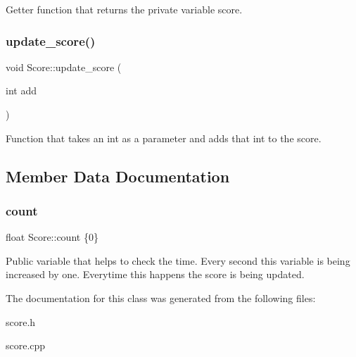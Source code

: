 Getter function that returns the private variable score. \mbox{\label{classScore_a98e9cf2e21db2a2b0ed2751bb53e8255}} 
\subsubsection{\texorpdfstring{update\+\_\+score()}{update\_score()}}
{\footnotesize\ttfamily void Score\+::update\+\_\+score (\begin{DoxyParamCaption}\item[{int}]{add }\end{DoxyParamCaption})}

Function that takes an int as a parameter and adds that int to the score. 

\subsection{Member Data Documentation}
\mbox{\label{classScore_afa64d0ac8f47b5eb21c83d9d1d529877}} 
\subsubsection{\texorpdfstring{count}{count}}
{\footnotesize\ttfamily float Score\+::count \{0\}}

Public variable that helps to check the time. Every second this variable is being increased by one. Everytime this happens the score is being updated. 

The documentation for this class was generated from the following files\+:\begin{DoxyCompactItemize}
\item 
score.\+h\item 
score.\+cpp\end{DoxyCompactItemize}
